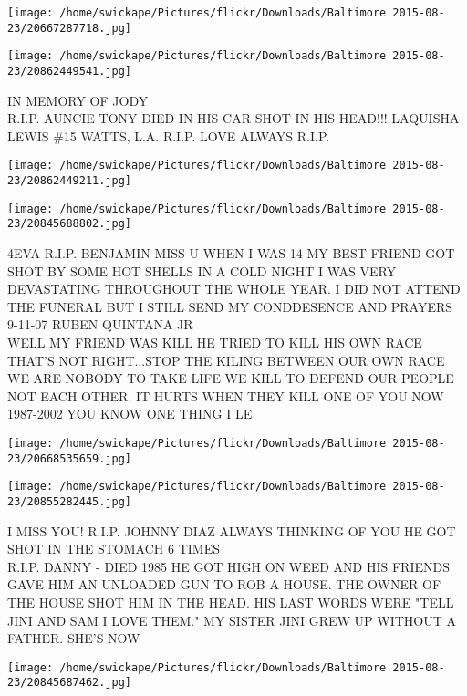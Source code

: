 \documentclass[10pt,letterpaper]{article}
\begin{document}
\texttt{[image: /home/swickape/Pictures/flickr/Downloads/Baltimore 2015-08-23/20667287718.jpg]}

\vspace{0.25in}
\texttt{[image: /home/swickape/Pictures/flickr/Downloads/Baltimore 2015-08-23/20862449541.jpg]}

IN MEMORY OF JODY\\
R.I.P. AUNCIE TONY DIED IN HIS CAR SHOT IN HIS HEAD!!! LAQUISHA LEWIS \#15 WATTS, L.A. R.I.P. LOVE ALWAYS R.I.P.\\
\pagebreak

\texttt{[image: /home/swickape/Pictures/flickr/Downloads/Baltimore 2015-08-23/20862449211.jpg]}

\vspace{0.25in}
\texttt{[image: /home/swickape/Pictures/flickr/Downloads/Baltimore 2015-08-23/20845688802.jpg]}

4EVA R.I.P. BENJAMIN MISS U WHEN I WAS 14 MY BEST FRIEND GOT SHOT BY SOME HOT SHELLS IN A COLD NIGHT I WAS VERY DEVASTATING THROUGHOUT THE WHOLE YEAR.  I DID NOT ATTEND THE FUNERAL BUT I STILL SEND MY CONDDESENCE AND PRAYERS 9{-}11{-}07 RUBEN QUINTANA JR\\
WELL MY FRIEND WAS KILL HE TRIED TO KILL HIS OWN RACE THAT'S NOT RIGHT...STOP THE KILING BETWEEN OUR OWN RACE WE ARE NOBODY TO TAKE LIFE WE KILL TO DEFEND OUR PEOPLE NOT EACH OTHER.  IT HURTS WHEN THEY KILL ONE OF YOU NOW 1987{-}2002 YOU KNOW ONE THING I LE\\
\pagebreak

\texttt{[image: /home/swickape/Pictures/flickr/Downloads/Baltimore 2015-08-23/20668535659.jpg]}

\vspace{0.25in}
\texttt{[image: /home/swickape/Pictures/flickr/Downloads/Baltimore 2015-08-23/20855282445.jpg]}

I MISS YOU!  R.I.P. JOHNNY DIAZ ALWAYS THINKING OF YOU HE GOT SHOT IN THE STOMACH 6 TIMES\\
R.I.P. DANNY {-} DIED 1985 HE GOT HIGH ON WEED AND HIS FRIENDS GAVE HIM AN UNLOADED GUN TO ROB A HOUSE.  THE OWNER OF THE HOUSE SHOT HIM IN THE HEAD.  HIS LAST WORDS WERE "TELL JINI AND SAM I LOVE THEM."  MY SISTER JINI GREW UP WITHOUT A FATHER.  SHE'S NOW\\
\pagebreak

\texttt{[image: /home/swickape/Pictures/flickr/Downloads/Baltimore 2015-08-23/20845687462.jpg]}
\end{document}
